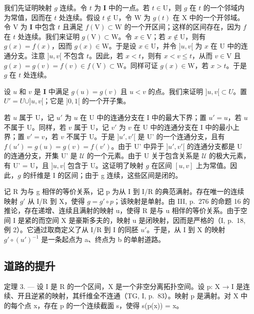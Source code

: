 我们先证明映射 \(g\) 连续。令 \(t\) 为 \(\mathbf{I}\) 中的一点。若 \(t \in \mathrm{U}\)，则 \(g\) 在 \(t\) 的一个邻域内为常值，因而在 \(t\) 处连续。假设 \(t \notin \mathrm{U}\)，令 \(\mathrm{W}\) 为 \(g(t)\) 在 \(\mathrm{X}\) 中的一个开邻域。令 \(\mathrm{V}\) 为 \(\mathbf{I}\) 中包含 \(t\) 且满足 \(f(\mathrm{V}) \subset \mathrm{W}\) 的一个开区间；这样的区间存在，因为 \(f\) 在 \(t\) 处连续。我们来证明 \(g(\mathrm{V}) \subset \mathrm{W}\)。令 \(x \in \mathrm{V}\)；若 \(x \notin \mathrm{U}\)，则有 \(g(x) = f(x)\)，因而 \(g(x) \in \mathrm{W}\)。于是设 \(x \in \mathrm{U}\)，并令 \(]u, v[\) 为 \(x\) 在 \(\mathrm{U}\) 中的连通分支。注意 \(]u, v[\) 不包含 \(t\)。因此，若 \(x < t\)，则有 \(x < v \leqslant t\)，从而 \(v \in \mathrm{V}\) 且 \(g(x) = g(v) = f(v) \in f(\mathrm{V}) \subset \mathrm{W}\)。同样可证 \(g(x) \in \mathrm{W}\)，若 \(x > t\)。于是 \(g\) 在 \(t\) 处连续。

设 \(u\) 和 \(v\) 是 \(\mathbf{I}\) 中满足 \(g(u) = g(v)\) 且 \(u < v\) 的点。我们来证明 \(]u, v[ \subset U\)。置 \(U' = U \cup ]u, v[\)；它是 \(]0, 1[\) 的一个开子集。

若 \(u\) 属于 U，记 \(u'\) 为 \(u\) 在 U 中的连通分支在 I 中的最大下界；置 \(u' = u\)，若 \(u\) 不属于 U。同样，若 \(v\) 属于 U，记 \(v'\) 为 \(v\) 在 U 中的连通分支在 I 中的最小上界；置 \(v' = v\)，若 \(v\) 不属于 U。于是 \(]u', v'[\) 是 U' 的一个连通分支，且有 \(f(u') = g(u) = g(v) = f(v')\)。由于 U' 中异于 \(]u', v'[\) 的连通分支都是 U 的连通分支，开集 U' 是 \(\mathcal{U}\) 的一个元素。由于 U 关于包含关系是 \(\mathcal{U}\) 的极大元素，有 U' = U，且 \(]u, v[\) 包含于 U。这证明了映射 \(g\) 在区间 \([u, v]\) 上为常值。因此，\(g\) 的纤维是 I 的区间；由于 g 连续，这些区间是闭的。

记 R 为与 g 相伴的等价关系，记 p 为从 I 到 I/R 的典范满射。存在唯一的连续映射 \(g'\) 从 I/R 到 X，使得 \(g = g' \circ p\)；该映射是单射。由 III, p.~276 的命题 16 的推论，存在递增、连续且满射的映射 u，使得 R 是与 u 相伴的等价关系。由于空间 I 是紧的而空间 X 是豪斯多夫的，映射 u 是闭映射，因而是严格的（I, p.~18, 例 2）。它通过取商定义了从 I/R 到 I 的同胚 \(u'\)。于是，从 I 到 X 的映射 \(g' \circ (u')^{-1}\) 是一条起点为 a、终点为 b 的单射道路。

\subsection{道路的提升}

定理 3. --- 设 I 是 R 的一个区间，X 是一个非空分离拓扑空间。设 p: X → I 是连续、开且逆紧的映射，其纤维全不连通（TG, I, p.~83）。映射 p 是满射。对 X 中的每个点 x，存在 p 的一个连续截面 s，使得 s(p(x)) = x。


